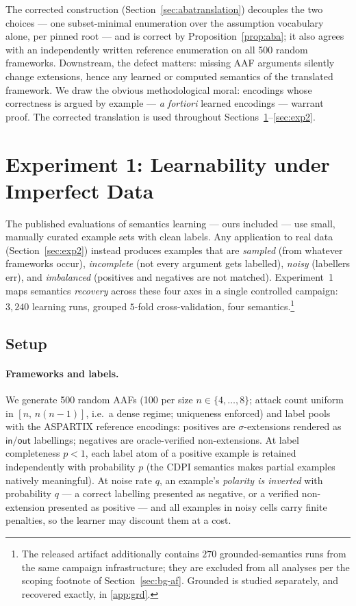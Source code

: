 \documentclass[review,12pt]{elsarticle}
\theoremstyle{definition}
\theoremstyle{remark}
\newcommand{\pred}[1]{\textsf{#1}}
\begin{document}
\noindent The corrected construction (Section~\ref{sec:abatranslation})
decouples the two choices --- one subset-minimal enumeration over the
assumption vocabulary alone, per pinned root --- and is correct by
Proposition~\ref{prop:aba}; it also agrees with an independently written
reference enumeration on all 500 random frameworks. Downstream, the defect
matters: missing AAF arguments silently
change extensions, hence any learned or computed semantics of the translated
framework. We draw the obvious methodological moral: encodings whose
correctness is argued by example --- \emph{a fortiori} learned encodings ---
warrant proof. The corrected translation is used throughout
Sections~\ref{sec:exp1}--\ref{sec:exp2}.

\section{Experiment 1: Learnability under Imperfect Data}
\label{sec:exp1}

The published evaluations of semantics learning --- ours included --- use small,
manually curated example sets with clean labels. Any application to real data
(Section~\ref{sec:exp2}) instead produces examples that are \emph{sampled}
(from whatever frameworks occur), \emph{incomplete} (not every argument gets
labelled), \emph{noisy} (labellers err), and \emph{imbalanced} (positives and
negatives are not matched). Experiment~1 maps semantics \emph{recovery} across
these four axes in a single controlled campaign: $3{,}240$ learning runs,
grouped $5$-fold cross-validation, four semantics.\footnote{The released
artifact additionally contains $270$ grounded-semantics runs from the same
campaign infrastructure; they are excluded from all analyses per the scoping
footnote of Section~\ref{sec:bg-af}. Grounded is studied separately, and
recovered exactly, in \ref{app:grd}.}

\subsection{Setup}
\label{sec:exp1setup}

\paragraph{Frameworks and labels.} We generate 500 random AAFs (100 per size
$n\in\{4,\dots,8\}$; attack count uniform in $[n,\,n(n-1)]$, i.e.\ a dense
regime; uniqueness enforced) and label pools with the ASPARTIX reference
encodings: positives are $\sigma$-extensions rendered as
$\pred{in}/\pred{out}$ labellings; negatives are oracle-verified
non-extensions. At label completeness $p<1$, each label atom of a positive
example is retained independently with probability $p$ (the CDPI semantics
makes partial examples natively meaningful). At noise rate $q$, an example's
\emph{polarity is inverted} with probability $q$ --- a correct labelling
presented as negative, or a verified non-extension presented as positive ---
and all examples in noisy cells carry finite penalties, so the learner may
discount them at a cost.
\end{document}
